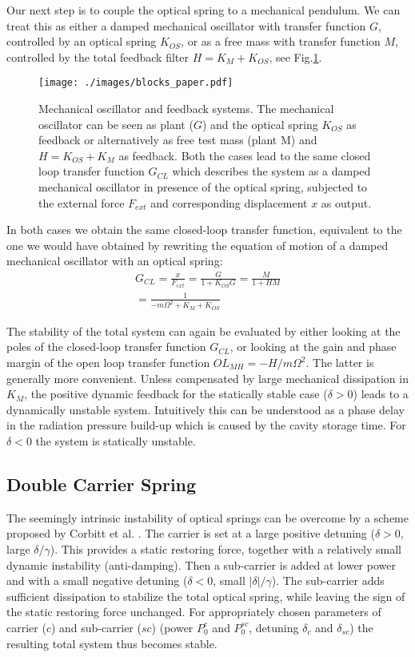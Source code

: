 \documentclass[%
 reprint,
 amsmath,amssymb,
 aps,
]{revtex4-1}
\begin{document}
Our next step is to couple the optical spring to a mechanical pendulum. We can treat this as either a damped mechanical oscillator with transfer function $G$, controlled by an optical spring $K_{OS}$, or as a free mass with transfer function $M$, controlled by the total feedback filter $H = K_M + K_{OS}$, see Fig.\ref{fig:blocks2}.
\begin{figure}[htbp]
	\centering
		\texttt{[image: ./images/blocks\_paper.pdf]}
	\caption{{Mechanical oscillator and feedback systems. The mechanical oscillator can be seen as plant ($G$) and the optical spring $K_{OS}$ as feedback or
	alternatively as free test mass (plant M) and $H=K_{OS}+K_M$ as feedback. 
	Both the cases lead to the same closed loop transfer function $G_{CL}$ which describes the system as a damped mechanical oscillator in presence of
	the optical spring, subjected to the external force $F_{ext}$ and corresponding displacement $x$ as output.}}
	\label{fig:blocks2}
\end{figure}
In both cases we obtain the same closed-loop transfer function, equivalent to the one we would have obtained by
rewriting the equation of motion of a damped mechanical oscillator with an optical spring:
\begin{eqnarray}
\label{eqn:TFco}
G_{CL}=\frac{x}{F_{ext}}=\frac{G}{1+K_{OS} G}=\frac{M}{1+H M}\nonumber\\
=\frac{1}{-m\Omega^2+K_M+K_{OS}}%
\end{eqnarray}

The stability of the total system can again be evaluated  by either looking at the poles of the closed-loop
transfer function $G_{CL}$, or looking at the gain and phase margin of the open loop transfer function $OL_{MH}=-H/m\Omega^2$. The latter is generally more convenient. Unless compensated by large mechanical dissipation in $K_M$, the positive dynamic feedback for the statically stable case ($\delta>0$) leads to a dynamically unstable system. 
Intuitively this can be understood as a phase delay in the radiation pressure build-up which is caused by the cavity storage time.
For $\delta<0$ the system is statically unstable.

\subsection{Double Carrier Spring}

The seemingly intrinsic instability of optical springs can be overcome by a scheme 
proposed by Corbitt et al. \cite{Corbitt07}. The carrier is set at a large positive detuning ($\delta>0$, large $\delta/\gamma$). This provides a static restoring force, together with a relatively small dynamic instability (anti-damping). Then a sub-carrier is added at lower power and with a small negative detuning ($\delta<0$, small $|\delta|/\gamma$). The sub-carrier adds sufficient dissipation to stabilize the total optical spring, while leaving the sign of the static restoring force unchanged.
For appropriately chosen parameters of carrier ($c$) and sub-carrier ($sc$) (power $P_0^c$ and $P_0^{sc}$, detuning  $\delta_c$ and $\delta_{sc}$) the resulting total system thus becomes stable.
\end{document}
